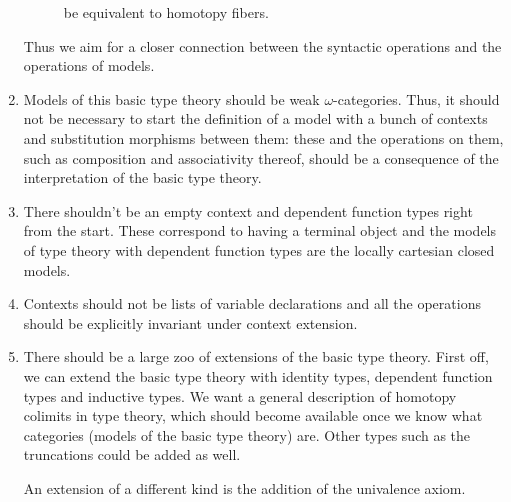 \begin{enumerate}
\begin{description}
      be equivalent to homotopy fibers.
      \end{description}
      Thus we aim for a closer connection between the syntactic operations and
      the operations of models.
\item Models of this basic type theory should be weak $\omega$-categories. Thus,
      it should not be necessary to start the definition of a model with a bunch
      of contexts and substitution morphisms between them: these and the
      operations on them, such as composition and associativity thereof, should
      be a consequence of the interpretation of the basic type theory.
\item There shouldn't be an empty context and dependent function types right
      from the start. These correspond to having a terminal object and the
      models of type theory with dependent function types are the locally
      cartesian closed models.
\item Contexts should not be lists of variable declarations and all the
      operations should be explicitly invariant under context extension.
\item There should be a large zoo of extensions of the basic type theory. First
      off, we can extend the basic type theory with identity types, dependent
      function types and inductive types. We want a general description of
      homotopy colimits in type theory, which should become available once we
      know what categories (models of the basic type theory) are. Other types
      such as the truncations could be added as well.
      
      An extension of a different kind is the addition of the univalence axiom.
\end{enumerate}

